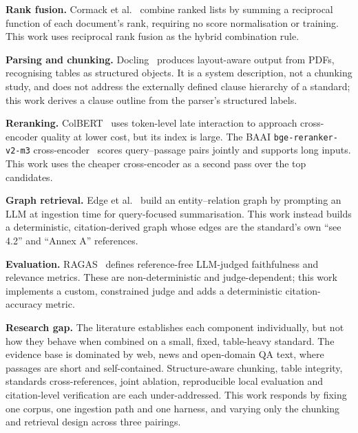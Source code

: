 \documentclass[conference]{IEEEtran}
\begin{document}
\textbf{Rank fusion.} Cormack et al.~\cite{cormack2009} combine ranked lists by summing a reciprocal function of each document's rank, requiring no score normalisation or training. This work uses reciprocal rank fusion as the hybrid combination rule.

\textbf{Parsing and chunking.} Docling~\cite{docling2024} produces layout-aware output from PDFs, recognising tables as structured objects. It is a system description, not a chunking study, and does not address the externally defined clause hierarchy of a standard; this work derives a clause outline from the parser's structured labels.

\textbf{Reranking.} ColBERT~\cite{khattab2020} uses token-level late interaction to approach cross-encoder quality at lower cost, but its index is large. The BAAI \texttt{bge-reranker-v2-m3} cross-encoder~\cite{bge2024} scores query--passage pairs jointly and supports long inputs. This work uses the cheaper cross-encoder as a second pass over the top candidates.

\textbf{Graph retrieval.} Edge et al.~\cite{edge2024} build an entity--relation graph by prompting an LLM at ingestion time for query-focused summarisation. This work instead builds a deterministic, citation-derived graph whose edges are the standard's own ``see 4.2'' and ``Annex A'' references.

\textbf{Evaluation.} RAGAS~\cite{es2024} defines reference-free LLM-judged faithfulness and relevance metrics. These are non-deterministic and judge-dependent; this work implements a custom, constrained judge and adds a deterministic citation-accuracy metric.

\textbf{Research gap.} The literature establishes each component individually, but not how they behave when combined on a small, fixed, table-heavy standard. The evidence base is dominated by web, news and open-domain QA text, where passages are short and self-contained. Structure-aware chunking, table integrity, standards cross-references, joint ablation, reproducible local evaluation and citation-level verification are each under-addressed. This work responds by fixing one corpus, one ingestion path and one harness, and varying only the chunking and retrieval design across three pairings.
\end{document}
